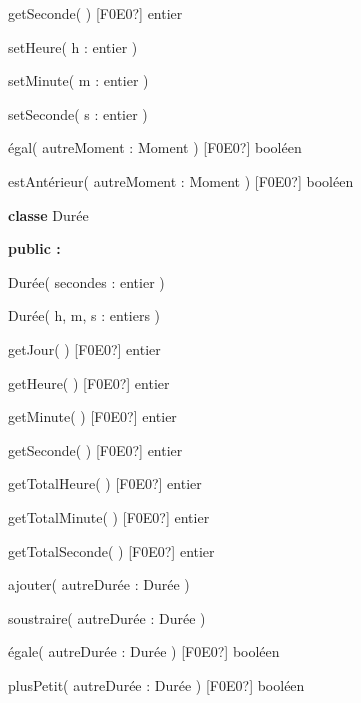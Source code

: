 {\sffamily
{} getSeconde( ) \textrm{[F0E0?]} entier}

{\sffamily
{} setHeure( h : entier )}

{\sffamily
{} setMinute( m : entier )}

{\sffamily
{} setSeconde( s : entier )}

{\sffamily
{} égal( autreMoment : Moment )
\textrm{[F0E0?]} booléen}

{\sffamily
{} estAntérieur( autreMoment : Moment )
\textrm{[F0E0?]} booléen}

{\sffamily
{}}


\bigskip

{\sffamily
\textbf{classe} Durée}

{\sffamily\bfseries
public :}

{\sffamily
{} Durée( secondes : entier )}

{\sffamily
{} Durée( h, m, s : entiers )}

{\sffamily
{} getJour( ) \textrm{[F0E0?]} entier}

{\sffamily
{} getHeure( ) \textrm{[F0E0?]} entier}

{\sffamily
{} getMinute( ) \textrm{[F0E0?]} entier}

{\sffamily
{} getSeconde( ) \textrm{[F0E0?]} entier}

{\sffamily
{} getTotalHeure( ) \textrm{[F0E0?]} entier}

{\sffamily
{} getTotalMinute( ) \textrm{[F0E0?]} entier}

{\sffamily
{} getTotalSeconde( ) \textrm{[F0E0?]} entier}

{\sffamily
{} ajouter( autreDurée : Durée )}

{\sffamily
{} soustraire( autreDurée : Durée )}

{\sffamily
{} égale( autreDurée : Durée )
\textrm{[F0E0?]} booléen}

{\sffamily
{} plusPetit( autreDurée : Durée )
\textrm{[F0E0?]} booléen}

{\sffamily
{}}

